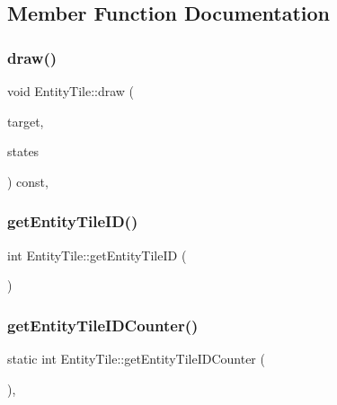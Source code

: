\subsection{Member Function Documentation}
\mbox{\label{class_entity_tile_a1d61eb82fed61b1c7aebc54249bd7c80}} 
\subsubsection{\texorpdfstring{draw()}{draw()}}
{\footnotesize\ttfamily void Entity\+Tile\+::draw (\begin{DoxyParamCaption}\item[{sf\+::\+Render\+Target \&}]{target,  }\item[{sf\+::\+Render\+States}]{states }\end{DoxyParamCaption}) const\hspace{0.3cm}{\ttfamily [private]}, {\ttfamily [virtual]}}

\mbox{\label{class_entity_tile_a2a4d57fa026ee00140e4cfd4ccc0d2b0}} 
\subsubsection{\texorpdfstring{get\+Entity\+Tile\+I\+D()}{getEntityTileID()}}
{\footnotesize\ttfamily int Entity\+Tile\+::get\+Entity\+Tile\+ID (\begin{DoxyParamCaption}{ }\end{DoxyParamCaption})}

\mbox{\label{class_entity_tile_acabd6691ddcf65a812c38e86e12e28e7}} 
\subsubsection{\texorpdfstring{get\+Entity\+Tile\+I\+D\+Counter()}{getEntityTileIDCounter()}}
{\footnotesize\ttfamily static int Entity\+Tile\+::get\+Entity\+Tile\+I\+D\+Counter (\begin{DoxyParamCaption}{ }\end{DoxyParamCaption})\hspace{0.3cm}{\ttfamily [inline]}, {\ttfamily [static]}}

